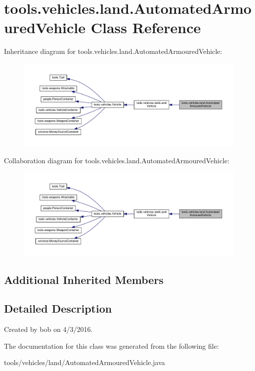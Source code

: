 \hypertarget{classtools_1_1vehicles_1_1land_1_1_automated_armoured_vehicle}{}\section{tools.\+vehicles.\+land.\+Automated\+Armoured\+Vehicle Class Reference}
\label{classtools_1_1vehicles_1_1land_1_1_automated_armoured_vehicle}


Inheritance diagram for tools.\+vehicles.\+land.\+Automated\+Armoured\+Vehicle\+:\nopagebreak
\begin{figure}[H]
\begin{center}
\leavevmode
\includegraphics[width=350pt]{classtools_1_1vehicles_1_1land_1_1_automated_armoured_vehicle__inherit__graph}
\end{center}
\end{figure}


Collaboration diagram for tools.\+vehicles.\+land.\+Automated\+Armoured\+Vehicle\+:\nopagebreak
\begin{figure}[H]
\begin{center}
\leavevmode
\includegraphics[width=350pt]{classtools_1_1vehicles_1_1land_1_1_automated_armoured_vehicle__coll__graph}
\end{center}
\end{figure}
\subsection*{Additional Inherited Members}


\subsection{Detailed Description}
Created by bob on 4/3/2016. 

The documentation for this class was generated from the following file\+:\begin{DoxyCompactItemize}
\item 
tools/vehicles/land/Automated\+Armoured\+Vehicle.\+java\end{DoxyCompactItemize}

